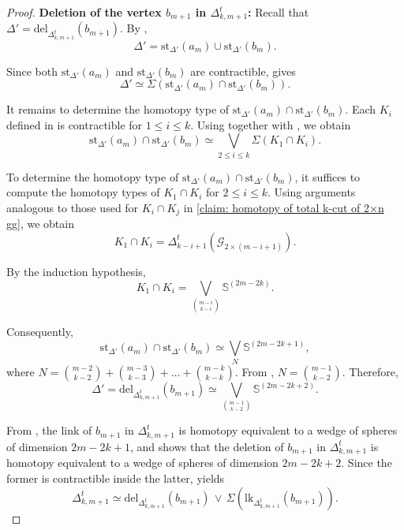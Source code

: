 \documentclass[11pt,reqno,a4paper]{amsart}
\theoremstyle{definition}
\theoremstyle{theorem}
\newcommand{\lno}{\left(}
\newcommand{\rno}{\right)}
\newcommand{\bbS}{\mathbb{S}}
\newcommand{\lk}{\mathrm{lk}}
\newcommand{\del}{\mathrm{del}}
\newcommand{\st}{\mathrm{st}}
\theoremstyle{remark}
\begin{document}
\begin{proof}
    \noindent\textbf{Deletion of the vertex $b_{m+1}$ in $\Delta_{k,m+1}^t$:} 
    Recall that $\Delta' = \del_{\Delta_{k,m+1}^t}\lno b_{m+1} \rno$. 
    By ,
    \[
    \Delta' = \st_{\Delta'}\lno a_m \rno \cup \st_{\Delta'}\lno b_m \rno.
    \]
    
    Since both $\st_{\Delta'}\lno a_m \rno$ and $\st_{\Delta'}\lno b_m \rno$ are contractible,
     gives
    \[
    \Delta' \simeq \Sigma\!\left( \st_{\Delta'}\lno a_m \rno \cap 
                                    \st_{\Delta'}\lno b_m \rno \right).
    \]
    
    It remains to determine the homotopy type of 
    $\st_{\Delta'}\lno a_m \rno \cap \st_{\Delta'}\lno b_m \rno$. 
    Each $K_i$ defined in 
     is contractible for 
    $1 \le i \le k$. 
    Using  together with 
    , we obtain
    \[
    \st_{\Delta'}\lno a_m \rno \cap \st_{\Delta'}\lno b_m \rno 
        \simeq 
        \bigvee_{2 \le i \le k} 
            \Sigma\!\left( K_1 \cap K_i \right).
    \]

    To determine the homotopy type of 
    $\st_{\Delta'}\lno a_m \rno \cap \st_{\Delta'}\lno b_m \rno$, it suffices to compute the homotopy types of $K_1 \cap K_i$ for 
    $2 \le i \le k$. 
    Using arguments analogous to those used for $K_i \cap K_j$ in 
    \cref{claim: homotopy of total k-cut of 2×n gg}, we obtain
    \[
    K_1 \cap K_i 
        = \Delta_{k-i+1}^t\!\left( \mathcal{G}_{2\times (m-i+1)} \right).
    \]
    
    By the induction hypothesis,
    \[
    K_1 \cap K_i 
        = \bigvee_{\binom{m-i}{\,k-i\,}} 
            \bbS^{\lno 2m - 2k \rno}.
    \]
    
    Consequently,
    \[
    \st_{\Delta'}\lno a_m \rno \cap \st_{\Delta'}\lno b_m \rno
        \simeq 
        \bigvee_{N} \bbS^{\lno 2m - 2k + 1 \rno},
    \]
    where $N = \binom{m-2}{k-2}+\binom{m-3}{k-3}+\dots+\binom{m-k}{k-k}$.
    From , $N = \binom{m-1}{k-2}$. 
    Therefore,
    \begin{equation}\label{deletion of b_n+1}
        \Delta' 
        = \del_{\Delta_{k,m+1}^t}\lno b_{m+1} \rno 
        \simeq 
        \bigvee_{\binom{m-1}{k-2}} 
            \bbS^{\lno 2m - 2k + 2 \rno}.
    \end{equation}

From , the link of $b_{m+1}$ in $\Delta_{k,m+1}^t$ is homotopy equivalent to a wedge of spheres of dimension $2m - 2k + 1$, and  shows that the deletion of $b_{m+1}$ in $\Delta_{k,m+1}^t$ is homotopy equivalent to a wedge of spheres of dimension $2m - 2k + 2$. 
Since the former is contractible inside the latter, 
 yields
\[
\Delta_{k,m+1}^t 
    \simeq 
    \del_{\Delta_{k,m+1}^t}\lno b_{m+1} \rno 
    \,\vee\, 
    \Sigma\!\left( \lk_{\Delta_{k,m+1}^t}\lno b_{m+1}\rno \right).
\]


\end{proof}
\end{document}
